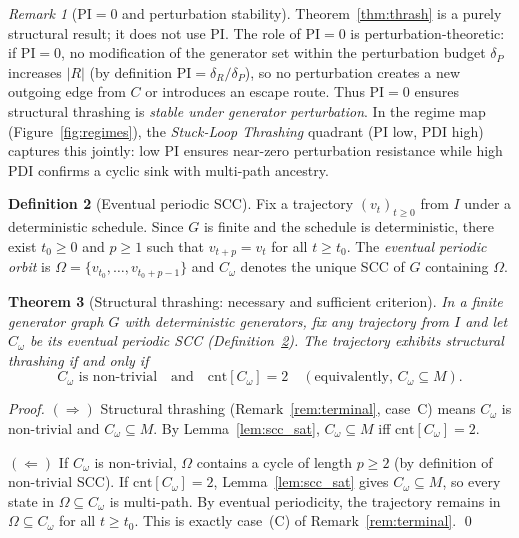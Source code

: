 \documentclass[11pt,letterpaper]{article}
\theoremstyle{plain}
\newtheorem{theorem}{Theorem}
\theoremstyle{definition}
\newtheorem{definition}[theorem]{Definition}
\theoremstyle{remark}
\newtheorem{remark}[theorem]{Remark}
\newcommand{\PDI}{\mathrm{PDI}}
\newcommand{\PI}{\mathrm{PI}}
\begin{document}
\begin{remark}[$\PI = 0$ and perturbation stability]
  \label{rem:pi_stab}
  Theorem~\ref{thm:thrash} is a purely structural result;
  it does not use $\PI$.
  The role of $\PI = 0$ is perturbation-theoretic:
  if $\PI = 0$, no modification of the generator set within the
  perturbation budget $\delta_P$ increases $|R|$
  (by definition $\PI = \delta_R / \delta_P$), so no perturbation
  creates a new outgoing edge from $C$ or introduces an escape route.
  Thus $\PI = 0$ ensures structural thrashing is \emph{stable under
  generator perturbation}.
  In the regime map (Figure~\ref{fig:regimes}), the
  \emph{Stuck-Loop Thrashing} quadrant ($\PI$ low, $\PDI$ high)
  captures this jointly: low $\PI$ ensures near-zero perturbation
  resistance while high $\PDI$ confirms a cyclic sink with multi-path ancestry.
\end{remark}

\begin{definition}[Eventual periodic SCC]
  \label{def:omega}
  Fix a trajectory $(v_t)_{t \ge 0}$ from $I$ under a deterministic schedule.
  Since $G$ is finite and the schedule is deterministic, there exist
  $t_0 \geq 0$ and $p \geq 1$ such that $v_{t+p} = v_t$ for all $t \geq t_0$.
  The \emph{eventual periodic orbit} is
  $\Omega = \{v_{t_0}, \ldots, v_{t_0+p-1}\}$
  and $C_\omega$ denotes the unique SCC of $G$ containing $\Omega$.
\end{definition}

\begin{theorem}[Structural thrashing: necessary and sufficient criterion]
  \label{thm:thrash_iff}
  In a finite generator graph $G$ with deterministic generators, fix any
  trajectory from $I$ and let $C_\omega$ be its eventual periodic SCC
  (Definition~\ref{def:omega}).
  The trajectory exhibits structural thrashing if and only if
  \[
    C_\omega \text{ is non-trivial}
    \quad\text{and}\quad
    \mathrm{cnt}[C_\omega] = 2
    \quad (\text{equivalently, } C_\omega \subseteq M).
  \]
\end{theorem}
\begin{proof}
  $(\Rightarrow)$
  Structural thrashing (Remark~\ref{rem:terminal}, case~C) means
  $C_\omega$ is non-trivial and $C_\omega \subseteq M$.
  By Lemma~\ref{lem:scc_sat}, $C_\omega \subseteq M$ iff
  $\mathrm{cnt}[C_\omega] = 2$.

  $(\Leftarrow)$
  If $C_\omega$ is non-trivial, $\Omega$ contains a cycle of length
  $p \geq 2$ (by definition of non-trivial SCC).
  If $\mathrm{cnt}[C_\omega] = 2$, Lemma~\ref{lem:scc_sat} gives
  $C_\omega \subseteq M$, so every state in $\Omega \subseteq C_\omega$
  is multi-path.
  By eventual periodicity, the trajectory remains in $\Omega \subseteq C_\omega$
  for all $t \geq t_0$.
  This is exactly case~(C) of Remark~\ref{rem:terminal}. \qed
\end{proof}
\end{document}
